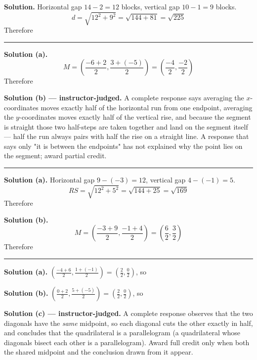 \documentclass[12pt]{article}
\begin{document}
\noindent\textbf{Solution.} Horizontal gap $14 - 2 = 12$ blocks, vertical gap
$10 - 1 = 9$ blocks.
\[ d = \sqrt{12^2 + 9^2} = \sqrt{144 + 81} = \sqrt{225} \]
Therefore 

\vspace{0.15cm}\noindent\rule{\linewidth}{0.2pt}


\noindent\textbf{Solution (a).}
\[ M = \left( \frac{-6+2}{2}, \frac{3+(-5)}{2} \right)
     = \left( \frac{-4}{2}, \frac{-2}{2} \right) \]
Therefore 

\noindent\textbf{Solution (b) --- instructor-judged.} A complete response says
averaging the $x$-coordinates moves exactly half of the horizontal run from one
endpoint, averaging the $y$-coordinates moves exactly half of the vertical rise,
and because the segment is straight those two half-steps are taken together and
land on the segment itself --- half the run always pairs with half the rise on a
straight line. A response that says only "it is between the endpoints" has not
explained why the point lies on the segment; award partial credit.

\vspace{0.15cm}\noindent\rule{\linewidth}{0.2pt}


\noindent\textbf{Solution (a).} Horizontal gap $9 - (-3) = 12$, vertical gap
$4 - (-1) = 5$.
\[ RS = \sqrt{12^2 + 5^2} = \sqrt{144 + 25} = \sqrt{169} \]
Therefore 

\noindent\textbf{Solution (b).}
\[ M = \left( \frac{-3+9}{2}, \frac{-1+4}{2} \right)
     = \left( \frac{6}{2}, \frac{3}{2} \right) \]
Therefore 

\vspace{0.15cm}\noindent\rule{\linewidth}{0.2pt}


\noindent\textbf{Solution (a).}
$\left( \frac{-4+6}{2}, \frac{1+(-1)}{2} \right) = \left( \frac{2}{2}, \frac{0}{2} \right)$,
so 

\noindent\textbf{Solution (b).}
$\left( \frac{0+2}{2}, \frac{5+(-5)}{2} \right) = \left( \frac{2}{2}, \frac{0}{2} \right)$,
so 

\noindent\textbf{Solution (c) --- instructor-judged.} A complete response
observes that the two diagonals have the \emph{same} midpoint, so each diagonal
cuts the other exactly in half, and concludes that the quadrilateral is a
parallelogram (a quadrilateral whose diagonals bisect each other is a
parallelogram). Award full credit only when both the shared midpoint and the
conclusion drawn from it appear.
\end{document}
